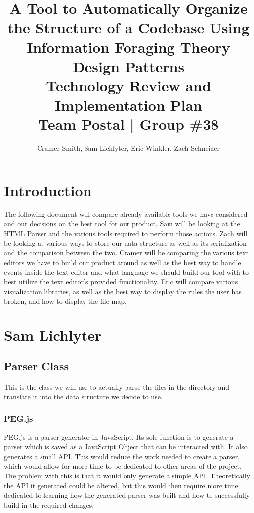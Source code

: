 \documentclass[letterpaper,10pt,titlepage,draftclsnofoot,onecolumn,onesided] {IEEEtran}
\def\doctitle{A Tool to Automatically Organize the Structure of a Codebase Using Information Foraging Theory Design Patterns}
\def\doctype{Technology Review and Implementation Plan}
\def\team{Team Postal | Group \#38}
\begin{document}
\title{\Huge{\bfseries{\textsf{\doctitle}}}\\\textsf{\Large{\doctype}}\\\textsf{\large{\team}}}
\author{Cramer Smith, Sam Lichlyter, Eric Winkler, Zach Schneider}

\maketitle
\vfill
\vfill

\pagebreak

\tableofcontents

\pagebreak

\section{Introduction}
The following document will compare already available tools we have considered and our decisions on the best tool for our product.
Sam will be looking at the HTML Parser and the various tools required to perform those actions.
Zach will be looking at various ways to store our data structure as well as its serialization and the comparison between the two.
Cramer will be comparing the various text editors we have to build our product around as well as the best way to handle events inside the text editor and what language we should build our tool with to best utilize the text editor's provided functionality.
Eric will compare various visualization libraries, as well as the best way to display the rules the user has broken, and how to display the file map.  

\section{Sam Lichlyter}

\subsection{Parser Class}
This is the class we will use to actually parse the files in the directory and translate it into the data structure we decide to use.

\subsubsection{PEG.js}
PEG.js is a parser generator in JavaScript.
Its sole function is to generate a parser which is saved as a JavaScript Object that can be interacted with.
It also generates a small API.
This would reduce the work needed to create a parser, which would allow for more time to be dedicated to other areas of the project.
The problem with this is that it would only generate a simple API.
Theoretically the API it generated could be altered, but this would then require more time dedicated to learning how the generated parser was built and how to successfully build in the required changes.
\cite{pegjs}
\end{document}
